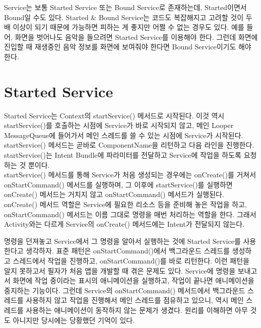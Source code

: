 Service는 보통 Started Service 또는 Bound Service로 존재하는데, Started이면서 Bound일 수도 있다. Started \& Bound Service는 코드도 복잡해지고 고려할 것이 두 배 이상이 되기 때문에 가능하면 피하는 게 좋지만 어쩔 수 없는 경우도 있다.
예를 들어, 화면을 벗어나도 음악을 들으려면 Started Service를 이용해야 한다. 그런데 화면에 진입할 때 재생중인 음악 정보를 화면에 보여줘야 한다면 Bound Service이기도 해야 한다.

\section{Started Service}
Started Service는 Context의 startService() 메서드로 시작된다. 
이것 역시 startService()를 호출하는 시점에 Service가 바로 시작되지 않고, 메인 Looper MessageQueue에 들어가서 메인 스레드를 쓸 수 있는 시점에 Service가 시작된다. 
startService() 메서드는 곧바로 ComponentName을 리턴하고 다음 라인을 진행한다. startService()는 Intent Bundle에 파라미터를 전달하고 Service에 작업을 하도록 요청하는 것 뿐이다.\\

startService() 메서드를 통해 Service가 처음 생성되는 경우에는 onCreate()를 거쳐서 onStartCommand() 메서드를 실행하며, 그 이후에 startService()를 실행하면 onCreate() 메서드는 거치지 않고 onStartCommand() 메서드가 실행된다.
onCreate() 메서드 역할은 Service에 필요한 리소스 등을 준비해 놓은 작업을 하고, onStartCommand() 메서드는 이름 그대로 명령을 매번 처리하는 역할을 한다. 그래서 Activity와는 다르게 Service의 onCreate() 메서드에는 Intent가 전달되지 않는다.\\

명령을 던져놓고 Service에서 그 명령을 알아서 실행하는 것에 Started Service를 사용한다고 생각하자.
표준 패턴은 onStartCommand()에서 백그라운드 스레드를 생성하고 
스레드에서 작업을 진행하고, onStartCommand()를 바로 리턴한다. 이런 패턴을 알지 못하고서 필자가 처음 앱을 개발할 때 겪은 문제도 있다. Service에 명령을 보내고서 화면에 작업 중이라는 표시의 애니메이션을 실행하고, 작업이 끝나면 애니메이션을 중지하는 기능이다.
그런데 Service의  onStartCommand() 메서드에서 백그라운드 스레드를 사용하지 않고 작업을 진행해서 메인 스레드를 점유하고 있으니, 역시 메인 스레드를 사용하는 애니메이션이 동작하지 않는 문제가 생겼다. 원리를 이해하면 아무 것도 아니지만 당시에는 당황했던 기억이 있다.\\

